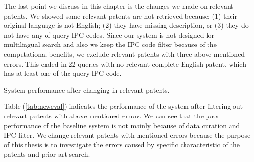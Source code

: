 
The last point we discuss in this chapter is the changes we made on relevant patents. We showed 
some relevant patents are not retrieved because: (1) their original language is not English; (2) they have missing description, or (3) they do not have any of query IPC codes. 
Since our system is not designed for multilingual search and also we keep the IPC code filter because of the computational benefits, we exclude relevant patents with three above-mentioned errors. This ended in 22 queries with no relevant complete English patent, which has at least one of the query IPC code.  
\begin{table}[htpb]
  \begin{center}
   \caption{System performance after changing in relevant patents.}
     
  \label{tab:neweval}
  \end{center}  
\end{table}
\FloatBarrier

Table (\ref{tab:neweval}) indicates the performance of the system after filtering out relevant patents with above mentioned errors. We can see that the poor performance of the baseline system is not mainly because of data curation and IPC filter. We change relevant patents with mentioned errors because the purpose of this thesis is to investigate the errors caused by specific characteristic of the patents and prior art search.
%

